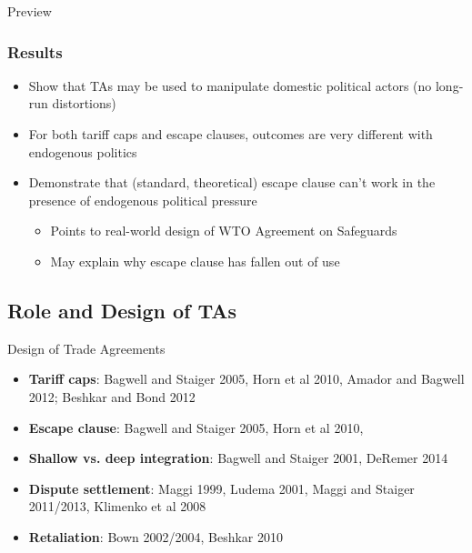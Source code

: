 \documentclass[handout]{beamer}
\begin{document}
\begin{frame}{Preview}
\frametitle{Results}

\pause
\begin{itemize}[<+->]
	\item Show that TAs may be used to manipulate domestic political actors (no long-run distortions)
	\item For both tariff caps and escape clauses, outcomes are very different with endogenous politics
	\item Demonstrate that (standard, theoretical) escape clause can't work in the presence of endogenous political pressure
		\begin{itemize}
			\item Points to real-world design of WTO Agreement on Safeguards
			\item May explain why escape clause has fallen out of use
		\end{itemize}
\end{itemize}
\end{frame}

\subsection{Role and Design of TAs}
\begin{frame}{Design of Trade Agreements}
\pause
\begin{itemize}[<+->]
	\item \textbf{Tariff caps}: Bagwell and Staiger 2005, Horn et al 2010, Amador and Bagwell 2012; Beshkar and Bond 2012
	\item \textbf{Escape clause}: Bagwell and Staiger 2005, Horn et al 2010, 
	\item \textbf{Shallow vs. deep integration}: Bagwell and Staiger 2001, DeRemer 2014
	\item \textbf{Dispute settlement}: Maggi 1999, Ludema 2001, Maggi and Staiger 2011/2013, Klimenko et al 2008
	\item \textbf{Retaliation}: Bown 2002/2004, Beshkar 2010
\end{itemize}
\end{frame} 
\end{document}
